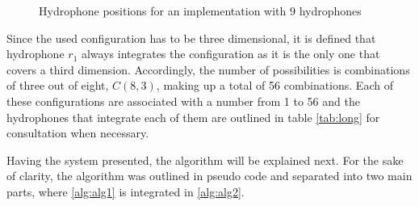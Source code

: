 \begin{figure}[!htbp]
	
	\captionsetup{justification=centering,margin=2cm}
	\caption{Hydrophone positions for an implementation with 9 hydrophones}
	\label{fig:9h-config}
\end{figure}

Since the used configuration has to be three dimensional, it is defined that hydrophone $r_1$ always integrates the configuration as it is the only one that covers a third dimension. Accordingly, the number of possibilities is combinations of three out of eight, $C(8,3)$, making up a total of 56 combinations. Each of these configurations are associated with a number from 1 to 56 and the hydrophones that integrate each of them are outlined in table \ref{tab:long} for consultation when necessary.

Having the system presented, the algorithm will be explained next. For the sake of clarity, the algorithm was outlined in pseudo code and separated into two main parts, where \ref{alg:alg1} is integrated in \ref{alg:alg2}.

